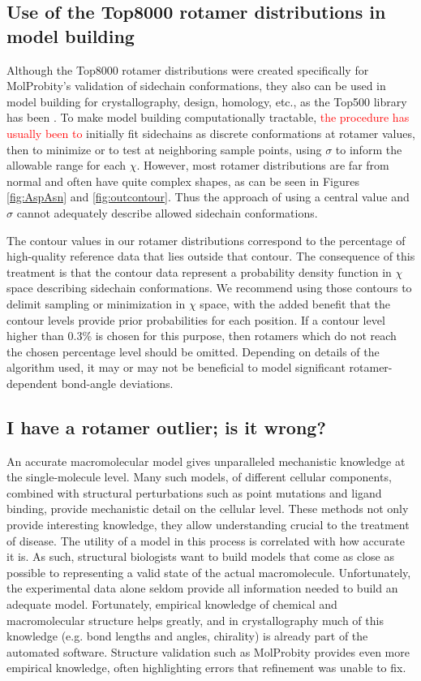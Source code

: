 \subsection{Use of the Top8000 rotamer distributions in model building}
Although the Top8000 rotamer distributions were created specifically for MolProbity's validation of sidechain conformations, they also can be used in model building for crystallography, design, homology, etc., as the Top500 library has been \cite{Arendall2005, Langer2008, Emsley:ba5144, Headd2008, Terwilliger2008, Adams:2010fk, Gainza2013}. To make model building computationally tractable, \textcolor{red}{the procedure has usually been to} initially fit sidechains as discrete conformations at rotamer values, then to minimize or to test at neighboring sample points, using $\sigma$ to inform the allowable range for each $\chi$. However, most rotamer distributions are far from normal and often have quite complex shapes, as can be seen in Figures \ref{fig:AspAsn} and \ref{fig:outcontour}. Thus the approach of using a central value and $\sigma$ cannot adequately describe allowed sidechain conformations. 

The contour values in our rotamer distributions correspond to the percentage of high-quality reference data that lies outside that contour. The consequence of this treatment is that the contour data represent a probability density function in $\chi$ space describing sidechain conformations. We recommend using those contours to delimit sampling or minimization in $\chi$ space, with the added benefit that the contour levels provide prior probabilities for each position. If a contour level higher than 0.3\% is chosen for this purpose, then rotamers which do not reach the chosen percentage level should be omitted. Depending on details of the algorithm used, it may or may not be beneficial to model significant rotamer-dependent bond-angle deviations.

\subsection{I have a rotamer outlier; is it wrong?}
An accurate macromolecular model gives unparalleled mechanistic knowledge at the single-molecule level. Many such models, of different cellular components, combined with structural perturbations such as point mutations and ligand binding, provide mechanistic detail on the cellular level. These methods not only provide interesting knowledge, they allow understanding crucial to the treatment of disease. The utility of a model in this process is correlated with how accurate it is. As such, structural biologists want to build models that come as close as possible to representing a valid state of the actual macromolecule. Unfortunately, the experimental data alone seldom provide all information needed to build an adequate model. Fortunately, empirical knowledge of chemical and macromolecular structure helps greatly, and in crystallography much of this knowledge (e.g. bond lengths and angles, chirality) is already part of the automated software. Structure validation such as MolProbity provides even more empirical knowledge, often highlighting errors that refinement was unable to fix.

